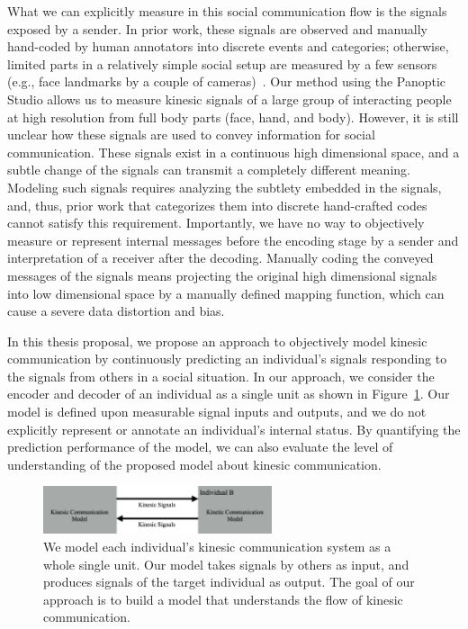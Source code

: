 What we can explicitly measure in this social communication flow is the signals exposed by a sender. In prior work, these signals are observed and manually hand-coded by human annotators into discrete events and categories; otherwise, limited parts in a relatively simple social setup are measured by a few sensors (e.g., face landmarks by a couple of cameras)~\cite{harrigan2013methodology, dael2015measuring}. Our method using the Panoptic Studio allows us to measure kinesic signals of a large group of interacting people at high resolution from full body parts (face, hand, and body). However, it is still unclear how these signals are used to convey information for social communication. These signals exist in a continuous high dimensional space, and a subtle change of the signals can transmit a completely different meaning. Modeling such signals requires analyzing the subtlety embedded in the signals, and, thus, prior work that categorizes them into discrete hand-crafted codes cannot satisfy this requirement. Importantly, we have no way to objectively measure or represent internal messages before the encoding stage by a sender and interpretation of a receiver after the decoding. Manually coding the conveyed messages of the signals means projecting the original high dimensional signals into low dimensional space by a manually defined mapping function, which can cause a severe data distortion and bias. 

In this thesis proposal, we propose an approach to objectively model kinesic communication by continuously predicting an individual's signals responding to the signals from others in a social situation. In our approach, we consider the encoder and decoder of an individual as a single unit as shown in Figure~\ref{fig:senderreceiver}. Our model is defined upon measurable signal inputs and outputs, and we do not explicitly represent or annotate an individual's internal status. By quantifying the prediction performance of the model, we can also evaluate the level of understanding of the proposed model about kinesic communication. 

\begin{figure}[t]
	\centering
	\includegraphics[width=0.6\textwidth]{figures/kinesicmodel}
	\caption{We model each individual's kinesic communication system as a whole single unit. Our model takes signals by others as input, and produces signals of the target individual as output. The goal of our approach is to build a model that understands the flow of kinesic communication. } 
	\label{fig:senderreceiver}
\end{figure}

